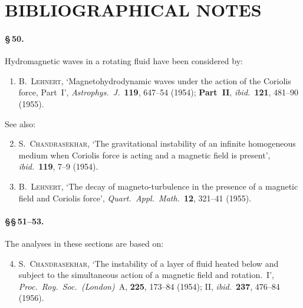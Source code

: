 
\section*{BIBLIOGRAPHICAL NOTES}

\paragraph{\S\,50.} Hydromagnetic waves in a rotating fluid have been considered by:
\begin{enumerate}
\item B.~\textsc{Lehnert}, `Magnetohydrodynamic waves under the action of the
Coriolis force, Part~I', \textit{Astrophys.\ J.}\ \textbf{119}, 647--54 (1954);
\textbf{Part~II}, \textit{ibid.}\ \textbf{121}, 481--90 (1955).
\end{enumerate}
See also:
\begin{enumerate}\setcounter{enumi}{1}
\item S.~\textsc{Chandrasekhar}, `The gravitational instability of an infinite homogeneous medium when Coriolis force is acting and a magnetic field is present',
\textit{ibid.}\ \textbf{119}, 7--9 (1954).
\item B.~\textsc{Lehnert}, `The decay of magneto-turbulence in the presence of a
magnetic field and Coriolis force', \textit{Quart.\ Appl.\ Math.}\ \textbf{12}, 321--41 (1955).
\end{enumerate}

\paragraph{\S\S\,51--53.} The analyses in these sections are based on:
\begin{enumerate}\setcounter{enumi}{3}
\item S.~\textsc{Chandrasekhar}, `The instability of a layer of fluid heated below and
subject to the simultaneous action of a magnetic field and rotation.~I',
\textit{Proc.\ Roy.\ Soc.\ (London)}~A, \textbf{225}, 173--84 (1954); II, \textit{ibid.}\ \textbf{237}, 476--84 (1956).
\end{enumerate}


